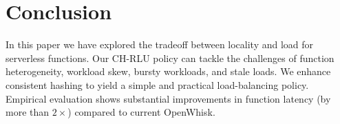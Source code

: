 \section{Conclusion}
In this paper we have explored the tradeoff between locality and load for serverless functions. 
Our CH-RLU policy can tackle the challenges of function heterogeneity, workload skew, bursty workloads, and stale loads.
We enhance consistent hashing to yield a simple and practical load-balancing policy. 
Empirical evaluation shows substantial improvements in function latency (by more than $2\times$) compared to current OpenWhisk.

